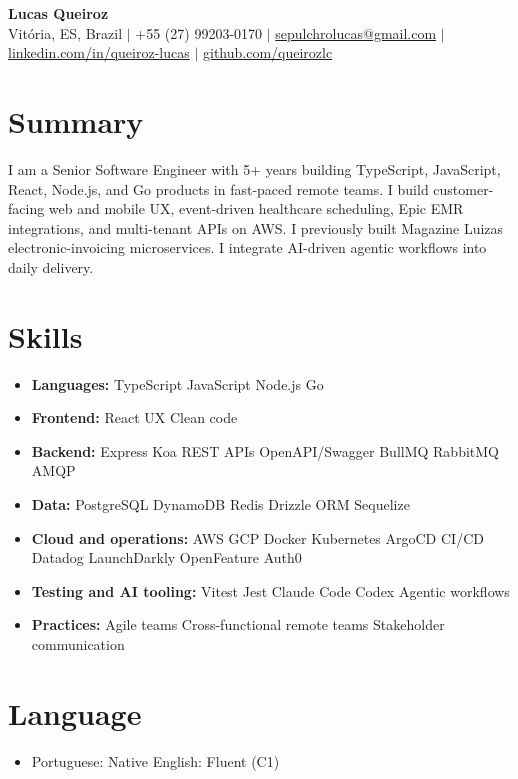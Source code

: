 \documentclass[letterpaper,10pt]{article}
\newcommand{\resumeItem}[1]{\item\small{#1}}
\newcommand{\resumeSubHeadingList}{\begin{itemize}[leftmargin=0.15in, label={}, nosep]}
\newcommand{\resumeSubHeadingListEnd}{\end{itemize}}
\begin{document}
\begin{center}
  \textbf{\Huge Lucas Queiroz} \\[3pt]
  \small Vit\'oria, ES, Brazil $|$ +55 (27) 99203-0170 $|$ \href{mailto:sepulchrolucas@gmail.com}{sepulchrolucas@gmail.com} $|$
  \href{https://linkedin.com/in/queiroz-lucas}{linkedin.com/in/queiroz-lucas} $|$
  \href{https://github.com/queirozlc}{github.com/queirozlc}
\end{center}
\vspace{2pt}

\section{Summary}
I am a Senior Software Engineer with 5+ years building TypeScript, JavaScript, React, Node.js, and Go products in fast-paced remote teams. I build customer-facing web and mobile UX, event-driven healthcare scheduling, Epic EMR integrations, and multi-tenant APIs on AWS. I previously built Magazine Luiza\textquotesingle{}s electronic-invoicing microservices. I integrate AI-driven agentic workflows into daily delivery.

\section{Skills}
\resumeSubHeadingList
\resumeItem{\textbf{Languages:} TypeScript \textbar{} JavaScript \textbar{} Node.js \textbar{} Go}
\resumeItem{\textbf{Frontend:} React \textbar{} UX \textbar{} Clean code}
\resumeItem{\textbf{Backend:} Express \textbar{} Koa \textbar{} REST APIs \textbar{} OpenAPI/Swagger \textbar{} BullMQ \textbar{} RabbitMQ \textbar{} AMQP}
\resumeItem{\textbf{Data:} PostgreSQL \textbar{} DynamoDB \textbar{} Redis \textbar{} Drizzle ORM \textbar{} Sequelize}
\resumeItem{\textbf{Cloud and operations:} AWS \textbar{} GCP \textbar{} Docker \textbar{} Kubernetes \textbar{} ArgoCD \textbar{} CI/CD \textbar{} Datadog \textbar{} LaunchDarkly \textbar{} OpenFeature \textbar{} Auth0}
\resumeItem{\textbf{Testing and AI tooling:} Vitest \textbar{} Jest \textbar{} Claude Code \textbar{} Codex \textbar{} Agentic workflows}
\resumeItem{\textbf{Practices:} Agile teams \textbar{} Cross-functional remote teams \textbar{} Stakeholder communication}
\resumeSubHeadingListEnd

\section{Language}
\resumeSubHeadingList
\resumeItem{Portuguese: Native \textbar{} English: Fluent (C1)}
\resumeSubHeadingListEnd
\end{document}
